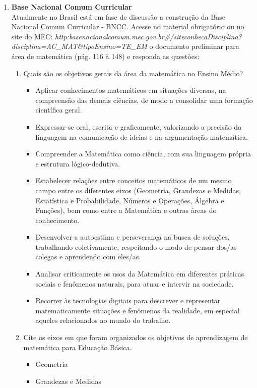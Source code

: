 \documentclass[a4paper, 12pt]{article}
\begin{document}
\begin{enumerate}
\item \textbf{Base Nacional Comum Curricular} \\
Atualmente no Brasil está em fase de discussão a construção da Base Nacional Comum Curricular - BNCC. Acesse no material obrigatório ou no site do MEC: \emph{http:\/\/basenacionalcomum.mec.gov.br\/\#/site\/conhecaDisciplina?disciplina=AC\_MAT\&tipoEnsino=TE\_EM} o documento preliminar para área de matemática (pág. 116 à 148) e responda as questões:

  \begin{enumerate}
  \item Quais são os objetivos gerais da área da matemática no Ensino Médio?
    \begin{itemize}
    \item Aplicar conhecimentos matemáticos em situações diversas, na compreensão das demais ciências, de modo a consolidar uma formação científica geral.
    \item Expressar-se oral, escrita e graficamente, valorizando a precisão da linguagem na comunicação de ideias e na argumentação matemática.
    \item Compreender a Matemática como ciência, com sua linguagem própria e estrutura lógico-dedutiva.
    \item Estabelecer relações entre conceitos matemáticos de um mesmo campo entre os diferentes eixos (Geometria, Grandezas e Medidas, Estatística e Probabilidade, Números e Operações, Álgebra e Funções), bem como entre a Matemática e outras áreas do conhecimento.
    \item Desenvolver a autoestima e perseverança na busca de soluções, trabalhando coletivamente, respeitando o modo de pensar dos/as colegas e aprendendo com eles/as.
    \item Analisar criticamente os usos da Matemática em diferentes práticas sociais e fenômenos naturais, para atuar e intervir na sociedade.
    \item Recorrer às tecnologias digitais para descrever e representar matematicamente situações e fenômenos da realidade, em especial aqueles relacionados ao mundo do trabalho.
    \end{itemize}
  \item Cite os eixos em que foram organizados os objetivos de aprendizagem de matemática para Educação Básica.
    \begin{itemize}
    \item Geometria
    \item Grandezas e Medidas

\end{itemize}
\end{enumerate}
\end{enumerate}
\end{document}
